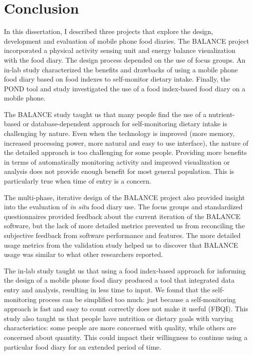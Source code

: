 \chapter{Conclusion}
\label{cha:futureWork}
In this dissertation, I described three projects that explore the design,  development and evaluation of mobile phone food diaries. The BALANCE project incorporated a physical activity sensing unit and energy balance visualization with the food diary. The design process depended on the use of focus groups. An in-lab study characterized the benefits and drawbacks of using a mobile phone food diary based on food indexes to self-monitor dietary intake. Finally, the POND tool and study investigated the use of a food index-based food diary on a mobile phone. 

The BALANCE study taught us that many people find the use of a nutrient-based or database-dependent approach for self-monitoring dietary intake is challenging by nature. Even when the technology is improved (more memory, increased processing power, more natural and easy to use interface), the nature of the detailed approach is too challenging for some people. Providing more benefits in terms of automatically monitoring activity and improved visualization or analysis does not provide enough benefit for most general population. This is particularly true when time of entry is a concern. 

The multi-phase, iterative design of the BALANCE project also provided insight into the evaluation of \textit{in situ} food diary use. The focus groups and standardized questionnaires provided feedback about the current iteration of the BALANCE software, but the lack of more detailed metrics prevented us from reconciling the subjective feedback from software performance and features. The more detailed usage metrics from the validation study helped us to discover that BALANCE usage was similar to what other researchers reported. 




The in-lab study taught us that using a food index-based approach for informing the design of a mobile phone food diary produced a tool that integrated data entry and analysis, resulting in less time to input. We found that the self-monitoring process can be simplified too much: just because a self-monitoring approach is fast and easy to count correctly does not make it useful (FBQI). This study also taught us that people have nutrition or dietary goals with varying characteristics: some people are more concerned with quality, while others are concerned about quantity. This could impact their willingness to continue using a particular food diary for an extended period of time. 


